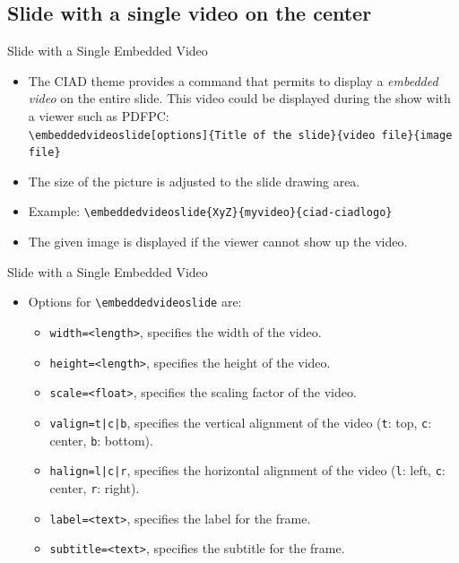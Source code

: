 \documentclass[english,sectioncirclenumberstyle]{ciadbeamer}
\begin{document}
\subsection{Slide with a single video on the center}
\subsectiontableofcontentslide

\begin{frame}{Slide with a Single Embedded Video}
	\begin{itemize}
	\item The CIAD theme provides a command that permits to display a \emph{embedded video} on the entire slide. This video could be displayed during the show with a viewer such as PDFPC: \\
		\texttt{{\textbackslash}embeddedvideoslide[options]\{Title of the slide\}\{video file\}\{image file\}}
	\item The size of the picture is adjusted to the slide drawing area.
	\item Example: \texttt{{\textbackslash}embeddedvideoslide\{XyZ\}\{myvideo\}\{ciad-ciadlogo\}} 
	\item The given image is displayed if the viewer cannot show up the video.
	\end{itemize}
\end{frame}

\begin{frame}{Slide with a Single Embedded Video \insertcontinuationtext}
	\begin{itemize}
	\item Options for \texttt{{\textbackslash}embeddedvideoslide} are:
		\begin{itemize}
		\item \texttt{width=<length>}, specifies the width of the video.
		\vfill
		\item \texttt{height=<length>}, specifies the height of the video.
		\vfill
		\item \texttt{scale=<float>}, specifies the scaling factor of the video.
		\vfill
		\item \texttt{valign=t|c|b}, specifies the vertical alignment of the video (\texttt{t}: top, \texttt{c}: center, \texttt{b}: bottom).
		\vfill
		\item \texttt{halign=l|c|r}, specifies the horizontal alignment of the video (\texttt{l}: left, \texttt{c}: center, \texttt{r}: right).
		\vfill
		\item \texttt{label=<text>}, specifies the label for the frame.
		\vfill
		\item \texttt{subtitle=<text>}, specifies the subtitle for the frame.
		\end{itemize}
	\end{itemize}
\end{frame}
\end{document}
